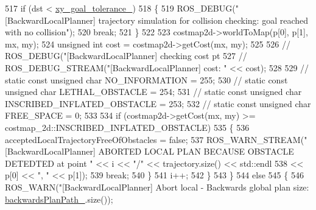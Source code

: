 \begin{DoxyCode}
{517                         \textcolor{keywordflow}{if} (dst < \hyperlink{classcl__move__base__z_1_1backward__local__planner_1_1BackwardLocalPlanner_aa4ec2c87947a3c08f8278eff052e7c8c}{xy\_goal\_tolerance\_})
518                         \{
519                             ROS\_DEBUG(\textcolor{stringliteral}{"[BackwardLocalPlanner] trajectory simulation for collision checking:
       goal reached with no collision"});
520                             \textcolor{keywordflow}{break};
521                         \}
522 
523                         costmap2d->worldToMap(p[0], p[1], mx, my);
524                         \textcolor{keywordtype}{unsigned} \textcolor{keywordtype}{int} cost = costmap2d->getCost(mx, my);
525 
526                         \textcolor{comment}{// ROS\_DEBUG("[BackwardLocalPlanner] checking cost pt %
527                         \textcolor{comment}{// ROS\_DEBUG\_STREAM("[BackwardLocalPlanner] cost: " << cost);}
528 
529                         \textcolor{comment}{// static const unsigned char NO\_INFORMATION = 255;}
530                         \textcolor{comment}{// static const unsigned char LETHAL\_OBSTACLE = 254;}
531                         \textcolor{comment}{// static const unsigned char INSCRIBED\_INFLATED\_OBSTACLE = 253;}
532                         \textcolor{comment}{// static const unsigned char FREE\_SPACE = 0;}
533 
534                         \textcolor{keywordflow}{if} (costmap2d->getCost(mx, my) >= costmap\_2d::INSCRIBED\_INFLATED\_OBSTACLE)
535                         \{
536                             acceptedLocalTrajectoryFreeOfObstacles = \textcolor{keyword}{false};
537                             ROS\_WARN\_STREAM(\textcolor{stringliteral}{"[BackwardLocalPlanner] ABORTED LOCAL PLAN BECAUSE OBSTACLE
       DETEDTED at point "} << i << \textcolor{stringliteral}{"/"} << trajectory.size() << std::endl
538                                                                                                            
                       << p[0] << \textcolor{stringliteral}{", "} << p[1]);
539                             \textcolor{keywordflow}{break};
540                         \}
541                         i++;
542                     \}
543                 \}
544                 \textcolor{keywordflow}{else}
545                 \{
546                     ROS\_WARN(\textcolor{stringliteral}{"[BackwardLocalPlanner] Abort local - Backwards global plan size: %
      \hyperlink{classcl__move__base__z_1_1backward__local__planner_1_1BackwardLocalPlanner_ad9cde5c85f782cab2ddb4030e3c3f2cf}{backwardsPlanPath\_}.size());
}}}
\end{DoxyCode}
